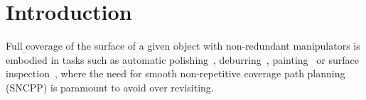 \documentclass[Afour,sageh,times]{sagej}
\begin{document}

\maketitle

\section{Introduction}
Full coverage of the surface of a given object with non-redundant manipulators is embodied in tasks such as automatic polishing~\cite{Tian2016Polishing}, deburring~\cite{Xie2016Grinding}, painting~\cite{Li2011Painting} or surface inspection~\cite{Molina2017Defects}, where the need for smooth non-repetitive coverage path planning (SNCPP) is paramount to avoid over revisiting. 
\end{document}

